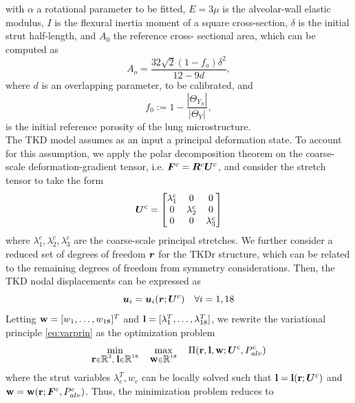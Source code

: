 \documentclass[preprint,3p,12pt,number,sort&compress]{elsarticle}
\def\mat   #1{\mbox{\bf #1}{}}
\def\vec   #1{\text{\boldmath $#1$}{}}
\def\ten   #1{\text{\boldmath $#1$}{}}
\def\R{\mbox{\(\mathbb{R}\)}}
\begin{document}
with $\alpha$ a rotational parameter to be fitted, $E = 3\mu$ is the alveolar-wall elastic modulus, $I$ is the flexural inertia moment of a square cross-section, $\delta$ is the initial strut half-length, and $A_0$ the  reference cross-
sectional area, which can be computed as \cite{ConchaEtal2018}
\begin{equation}
A_o = \frac{32\sqrt{2} (1-f_o)\delta^2}{12-9d},
\end{equation}
where $d$ is an overlapping parameter, to be calibrated, and
\begin{equation}
	f_0 := 1 - \frac{|\Theta_{Y_S}|}{|\Theta_Y|},
\end{equation}
is the initial reference porosity of the lung microstructure. \\

The TKD model assumes as an input a principal deformation state. To account for this assumption, we apply the polar decomposition theorem on the coarse-scale deformation-gradient tensor, i.e. $\ten F^c = \ten R^c \ten U^c$, and consider the stretch tensor to take the form
\begin{equation}
	\ten U^c = 
	\begin{bmatrix}
		\lambda_1^c	&	0	&	0\\
		0	&	\lambda_2^c	&	0\\
		0	&	0	&	\lambda_3^c
	\end{bmatrix}
	\label{eq:Fc}
\end{equation}
where $\lambda_1^c, \lambda_2^c, \lambda_3^c$ are the coarse-scale principal stretches. We further consider a reduced set of degrees of freedom $\vec r$ for the TKDr structure, which can be related to the remaining degrees of freedom from symmetry considerations. Then, the TKD nodal displacements can be expressed as
\begin{equation}
	\vec u_i = \vec u_i(\vec r; \ten U^c) \quad \forall i=1,18
\end{equation}
Letting $\mat w = [w_1, \ldots, w_{18}]^T$ and $\mat l = [\lambda_1^T,\ldots,\lambda_{18}^T]$, we rewrite the variational principle \eqref{eq:varprin} as the optimization problem
\begin{equation}
	\min \limits_{\mat r \in \R^3, \; \mat l \in \R^{18}} \quad \max \limits_{\mat w \in \R^{18}} \quad \Pi (\mat r, \mat l, \mat w; \ten U^c, P_{alv}^c)
\label{eqn:FullMinimizationProblem}
\end{equation}
where the strut variables $\lambda^T_e, w_e$ can be locally solved such that $\mat l = \mat l (\mat r;\ten U^c)$ and  $\mat w = \mat w(\mat r; \ten F^c, P_{alv}^c)$. Thus, the minimization problem reduces to
\end{document}
